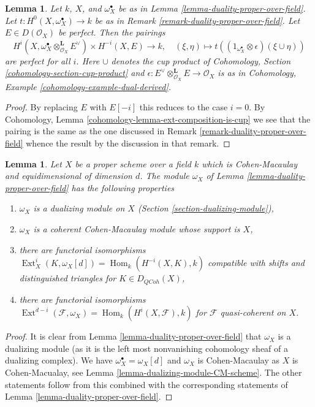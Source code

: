 \documentclass{stacks-project}
\theoremstyle{plain}
\newtheorem{lemma}[subsection]{Lemma}
\theoremstyle{definition}
\theoremstyle{remark}
\numberwithin{equation}{subsection}
\def\Hom{\mathop{\mathrm{Hom}}\nolimits}
\def\Ext{\mathop{\mathrm{Ext}}\nolimits}
\def\QCoh{\mathit{QCoh}}
\begin{document}
\begin{lemma}
\label{lemma-duality-proper-over-field-perfect}
Let $k$, $X$, and $\omega_X^\bullet$
be as in Lemma \ref{lemma-duality-proper-over-field}.
Let $t : H^0(X, \omega_X^\bullet) \to k$ be as in
Remark \ref{remark-duality-proper-over-field}.
Let $E \in D(\mathcal{O}_X)$ be perfect. Then the pairings
$$
H^i(X, \omega_X^\bullet \otimes_{\mathcal{O}_X}^\mathbf{L} E^\vee)
\times
H^{-i}(X, E) \longrightarrow k, \quad
(\xi, \eta) \longmapsto
t((1_{\omega_X^\bullet} \otimes \epsilon)(\xi \cup \eta))
$$
are perfect for all $i$. Here $\cup$ denotes the cup product
of Cohomology, Section \ref{cohomology-section-cup-product} and
$\epsilon : E^\vee \otimes_{\mathcal{O}_X}^\mathbf{L} E \to \mathcal{O}_X$
is as in Cohomology, Example \ref{cohomology-example-dual-derived}.
\end{lemma}

\begin{proof}
By replacing $E$ with $E[-i]$ this reduces to the case $i = 0$.
By Cohomology, Lemma \ref{cohomology-lemma-ext-composition-is-cup}
we see that the pairing is the same as the one discussed
in Remark \ref{remark-duality-proper-over-field}
whence the result by the discussion in that remark.
\end{proof}

\begin{lemma}
\label{lemma-duality-proper-over-field-CM}
Let $X$ be a proper scheme over a field $k$ which is Cohen-Macaulay
and equidimensional of dimension $d$. The module $\omega_X$
of Lemma \ref{lemma-duality-proper-over-field} has the following properties
\begin{enumerate}
\item $\omega_X$ is a dualizing module on $X$
(Section \ref{section-dualizing-module}),
\item $\omega_X$ is a coherent Cohen-Macaulay module whose support is $X$,
\item there are functorial isomorphisms
$\Ext^i_X(K, \omega_X[d]) = \Hom_k(H^{-i}(X, K), k)$
compatible with shifts and distinguished triangles for $K \in D_\QCoh(X)$,
\item there are functorial isomorphisms
$\Ext^{d - i}(\mathcal{F}, \omega_X) = \Hom_k(H^i(X, \mathcal{F}), k)$
for $\mathcal{F}$ quasi-coherent on $X$.
\end{enumerate}
\end{lemma}

\begin{proof}
It is clear from Lemma \ref{lemma-duality-proper-over-field}
that $\omega_X$ is a dualizing module (as it is the left most
nonvanishing cohomology sheaf of a dualizing complex).
We have $\omega_X^\bullet = \omega_X[d]$ and $\omega_X$ is Cohen-Macaulay
as $X$ is Cohen-Macualay, see Lemma \ref{lemma-dualizing-module-CM-scheme}.
The other statements follow from this combined with the
corresponding statements of Lemma \ref{lemma-duality-proper-over-field}.
\end{proof}
\end{document}
